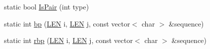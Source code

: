 \begin{DoxyCompactItemize}
\item 
static bool \hyperlink{namespace_rfold_1_1_parameter_ac79332af130ad1da3bb3bbd6008bca00}{Is\+Pair} (int type)
\item 
static int \hyperlink{namespace_rfold_1_1_parameter_a84c9aba4d96ad6776c066fdc8a05497f}{bp} (\hyperlink{energy__const_8hh_a05b49c662c073f89e86804f7856622a0}{L\+E\+N} i, \hyperlink{energy__const_8hh_a05b49c662c073f89e86804f7856622a0}{L\+E\+N} j, const vector$<$ char $>$ \&sequence)
\item 
static int \hyperlink{namespace_rfold_1_1_parameter_aec0b5515ac41c13814b1af83a843b408}{rbp} (\hyperlink{energy__const_8hh_a05b49c662c073f89e86804f7856622a0}{L\+E\+N} i, \hyperlink{energy__const_8hh_a05b49c662c073f89e86804f7856622a0}{L\+E\+N} j, const vector$<$ char $>$ \&sequence)
\end{DoxyCompactItemize}
